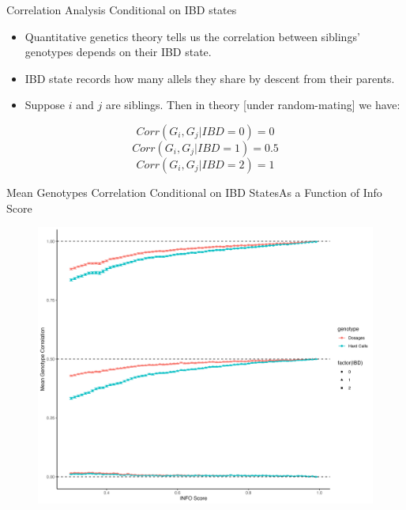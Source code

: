 \documentclass{beamer}
\begin{document}
\begin{frame}{Correlation Analysis Conditional on IBD states}
      \begin{itemize}
            \item Quantitative genetics theory tells us the correlation between siblings' genotypes depends on their IBD state.
            \vspace{15pt}
            \item IBD state records how many allels they share by descent from their parents.
            \vspace{15pt}
            \item Suppose \(i\) and \(j\) are siblings. Then in theory [under random-mating] we have:
      \end{itemize}
      \[
            Corr(G_i, G_j | IBD = 0) = 0
      \]
      \[
            Corr(G_i, G_j | IBD = 1) = 0.5
      \]
      \[
            Corr(G_i, G_j | IBD = 2) = 1
      \]
\end{frame}

\begin{frame}{Mean Genotypes Correlation Conditional on IBD States}{As a Function of Info Score}
      \begin{figure}
            \includegraphics[width= .75\textwidth]{fig/mean_gt_by_ibd.png}
      \end{figure}
\end{frame}
\end{document}
